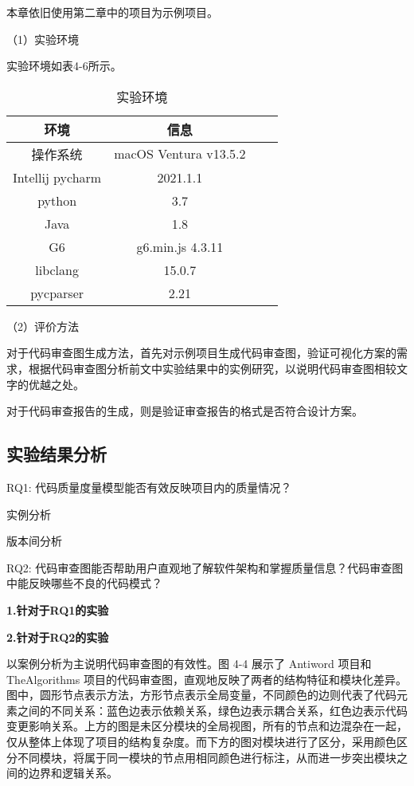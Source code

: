 本章依旧使用第二章中的项目为示例项目。

（1）实验环境

实验环境如表4-6所示。

\begin{table}[htbp]
\caption{实验环境}
\vspace{0.5em}\centering\wuhao
\begin{tabular}{cccc}
\toprule
    环境 & 信息 \\
\midrule
操作系统 & macOS Ventura v13.5.2  \\
Intellij pycharm & 2021.1.1   \\
python & 3.7   \\
Java & 1.8   \\
G6 & g6.min.js 4.3.11  \\  
libclang & 15.0.7  \\ 
pycparser & 2.21  \\
\bottomrule
\end{tabular}
\end{table}



（2）评价方法


对于代码审查图生成方法，首先对示例项目生成代码审查图，验证可视化方案的需求，根据代码审查图分析前文中实验结果中的实例研究，以说明代码审查图相较文字的优越之处。

对于代码审查报告的生成，则是验证审查报告的格式是否符合设计方案。

\subsection{实验结果分析}

RQ1: 代码质量度量模型能否有效反映项目内的质量情况？

实例分析

版本间分析

RQ2: 代码审查图能否帮助用户直观地了解软件架构和掌握质量信息？代码审查图中能反映哪些不良的代码模式？


\textbf{1.针对于RQ1的实验}


\textbf{2.针对于RQ2的实验}

以案例分析为主说明代码审查图的有效性。图 4-4 展示了 Antiword 项目和 TheAlgorithms 项目的代码审查图，直观地反映了两者的结构特征和模块化差异。图中，圆形节点表示方法，方形节点表示全局变量，不同颜色的边则代表了代码元素之间的不同关系：蓝色边表示依赖关系，绿色边表示耦合关系，红色边表示代码变更影响关系。上方的图是未区分模块的全局视图，所有的节点和边混杂在一起，仅从整体上体现了项目的结构复杂度。而下方的图对模块进行了区分，采用颜色区分不同模块，将属于同一模块的节点用相同颜色进行标注，从而进一步突出模块之间的边界和逻辑关系。

